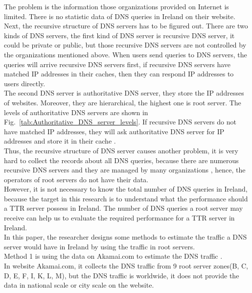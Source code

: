 \documentclass[conference]{IEEEtran}
\begin{document}
The problem is the information those organizations provided on Internet is limited. There is no statistic data of DNS queries in Ireland on their website.
\\

Next, the recursive structure of DNS servers has to be figured out. There are two kinds of DNS servers, the first kind of DNS server is recursive DNS server, it could be private or public, but those recursive DNS servers are not controlled by the organizations mentioned above. When users send queries to DNS servers, the queries will arrive recursive DNS servers first, if recursive DNS servers have matched IP addresses in their caches, then they can respond IP addresses to users directly. 
\\

The second DNS server is authoritative DNS server, they store the IP addresses of websites. Moreover, they are hierarchical, the highest one is root server. The levels of authoritative DNS servers are shown in Fig.~\ref{tab:Authoritative_DNS_server_levels}. If recursive DNS servers do not have matched IP addresses, they will ask authoritative DNS server for IP addresses and store it in their cache \cite{Authoritative_vs_Recursive_DNS_server}.
\\

Thus, the recursive structure of DNS server causes another problem, it is very hard to collect the records about all DNS queries, because there are numerous recursive DNS servers and they are managed by many organizations \cite{Authoritative_and_recursive_DNS}, hence, the operators of root servers do not have their data.
\\

However, it is not necessary to know the total number of DNS queries in Ireland, because the target in this research is to understand what the performance should a TTR server possess in Ireland. The number of DNS queries a root server may receive can help us to evaluate the required performance for a TTR server in Ireland.
\\

In this paper, the researcher designs some methods to estimate the traffic a DNS server would have in Ireland by using the traffic in root servers.
\\

Method 1 is using the data on Akamai.com to estimate the DNS traffic \cite{overall_DNS_traffic_trends}.
\\

In website Akamai.com, it collects the DNS traffic from 9 root server zones(B, C, D, E, F, I, K, L, M), but the DNS traffic is worldwide, it does not provide the data in national scale or city scale on the website.
\\
\end{document}
